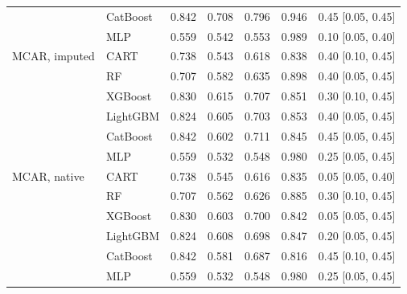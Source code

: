 \documentclass[pdflatex,sn-mathphys]{sn-jnl}
\theoremstyle{thmstyleone}
\begin{document}
\begin{table}[htbp]
\begin{tabular}{@{}llrrrrl@{}}
 & CatBoost & 0.842 & 0.708 & 0.796 & 0.946 & 0.45 [0.05, 0.45] \\
 & MLP & 0.559 & 0.542 & 0.553 & 0.989 & 0.10 [0.05, 0.40] \\
\midrule
MCAR, imputed & CART & 0.738 & 0.543 & 0.618 & 0.838 & 0.40 [0.10, 0.45] \\
 & RF & 0.707 & 0.582 & 0.635 & 0.898 & 0.40 [0.05, 0.45] \\
 & XGBoost & 0.830 & 0.615 & 0.707 & 0.851 & 0.30 [0.10, 0.45] \\
 & LightGBM & 0.824 & 0.605 & 0.703 & 0.853 & 0.40 [0.05, 0.45] \\
 & CatBoost & 0.842 & 0.602 & 0.711 & 0.845 & 0.45 [0.05, 0.45] \\
 & MLP & 0.559 & 0.532 & 0.548 & 0.980 & 0.25 [0.05, 0.45] \\
\midrule
MCAR, native & CART & 0.738 & 0.545 & 0.616 & 0.835 & 0.05 [0.05, 0.40] \\
 & RF & 0.707 & 0.562 & 0.626 & 0.885 & 0.30 [0.10, 0.45] \\
 & XGBoost & 0.830 & 0.603 & 0.700 & 0.842 & 0.05 [0.05, 0.45] \\
 & LightGBM & 0.824 & 0.608 & 0.698 & 0.847 & 0.20 [0.05, 0.45] \\
 & CatBoost & 0.842 & 0.581 & 0.687 & 0.816 & 0.45 [0.10, 0.45] \\
 & MLP & 0.559 & 0.532 & 0.548 & 0.980 & 0.25 [0.05, 0.45] \\
\bottomrule
\end{tabular}
\end{table}
\end{document}
